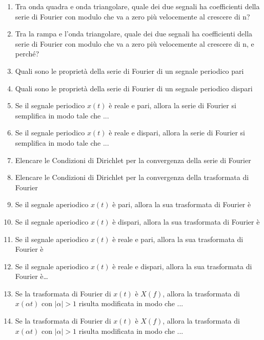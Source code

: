 \documentclass[12pt
]{article}
\begin{document}
\begin{enumerate}
\item 
Tra onda quadra e onda triangolare, quale dei due segnali ha coefficienti della serie di Fourier con modulo che
va a zero più velocemente al crescere di n?

\item
Tra la rampa e l'onda triangolare, quale dei due segnali ha
coefficienti della serie di Fourier con modulo che va a zero più
velocemente al crescere di n, e perché?

\item
Quali sono le proprietà della serie di Fourier di un segnale periodico
pari

\item
Quali sono le proprietà della serie di Fourier di un segnale periodico
dispari

\item 
Se il segnale periodico $x(t)$ è reale e pari, allora la serie di Fourier si semplifica in modo tale che ...


\item 
Se il segnale periodico $x(t)$ è reale e dispari, allora la serie di Fourier si semplifica in modo tale che ...


\item
Elencare le Condizioni di Dirichlet per la convergenza della serie di
Fourier

\item 
Elencare le Condizioni di Dirichlet per la convergenza della trasformata di Fourier



\item 
Se il segnale aperiodico $x(t)$ è pari, allora la sua trasformata di Fourier è	

\item 
Se il segnale aperiodico $x(t)$ è dispari, allora la sua trasformata di Fourier è

\item 
Se il segnale aperiodico $x(t)$ è reale e pari, allora la sua trasformata di Fourier è

\item
Se il segnale aperiodico $x(t)$ è reale e dispari, allora la sua
trasformata di Fourier è\ldots{}

\item 
Se la trasformata di Fourier di $x(t)$ è $X(f)$, allora la trasformata di $x(\alpha t)$ con $|\alpha|>1$ risulta modificata in modo
che ...

\item 
Se la trasformata di Fourier di $x(t)$ è $X(f)$, allora la trasformata di $x(\alpha t)$ con $|\alpha|>1$ risulta modificata in modo che ...




\end{enumerate}
\end{document}
